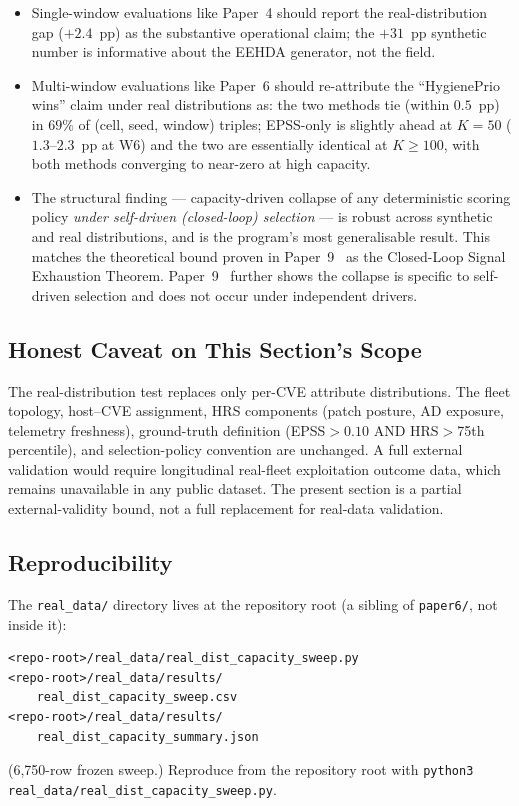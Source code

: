 \begin{itemize}
\item Single-window evaluations like Paper~4 should report the
real-distribution gap ($+2.4$~pp) as the substantive operational claim;
the $+31$~pp synthetic number is informative about the EEHDA
generator, not the field.

\item Multi-window evaluations like Paper~6 should re-attribute the
``HygienePrio wins'' claim under real distributions as: the two
methods tie (within $0.5$~pp) in $69\%$ of (cell, seed, window)
triples; EPSS-only is slightly ahead at $K = 50$ ($1.3$--$2.3$~pp at
W6) and the two are essentially identical at $K \geq 100$, with both
methods converging to near-zero at high capacity.

\item The structural finding --- capacity-driven collapse of any
deterministic scoring policy \emph{under self-driven (closed-loop)
selection} --- is robust across synthetic and real distributions,
and is the program's most generalisable result. This matches the
theoretical bound proven in Paper~9~\cite{paper9selftraj} as the
Closed-Loop Signal Exhaustion Theorem. Paper~9~\cite{paper9selftraj}
further shows the collapse is specific to self-driven selection and
does not occur under independent drivers.
\end{itemize}

\subsection{Honest Caveat on This Section's Scope}

The real-distribution test replaces only per-CVE attribute
distributions. The fleet topology, host--CVE assignment,
HRS components (patch posture, AD exposure, telemetry freshness),
ground-truth definition (EPSS$>0.10$ AND HRS$>$75th percentile),
and selection-policy convention are unchanged. A full external
validation would require longitudinal real-fleet exploitation
outcome data, which remains unavailable in any public dataset.
The present section is a partial external-validity bound, not a
full replacement for real-data validation.

\subsection{Reproducibility}

The \texttt{real\_data/} directory lives at the repository root
(a sibling of \texttt{paper6/}, not inside it):

{\small\begin{verbatim}
<repo-root>/real_data/real_dist_capacity_sweep.py
<repo-root>/real_data/results/
    real_dist_capacity_sweep.csv
<repo-root>/real_data/results/
    real_dist_capacity_summary.json
\end{verbatim}}
\noindent (6{,}750-row frozen sweep.) Reproduce from the repository
root with
\texttt{python3 real\_data/\allowbreak real\_dist\_capacity\_sweep.py}.
